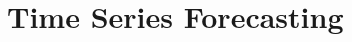 \documentclass[../main.tex]{subfiles}
\begin{document}
    \section{Time Series Forecasting}
        
        
\end{document}
